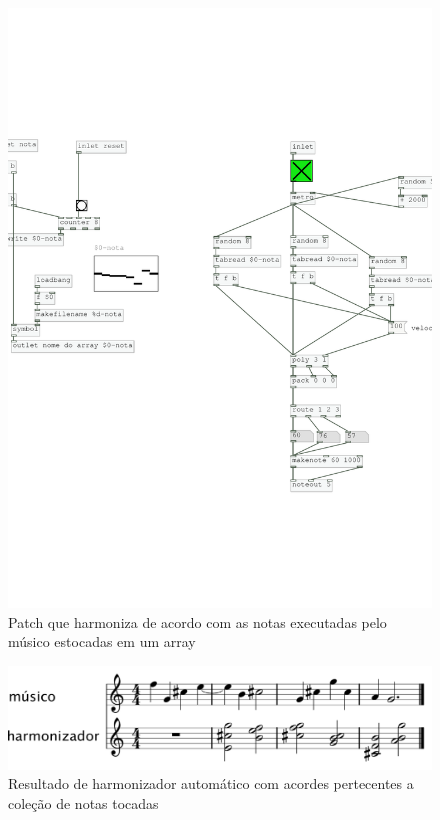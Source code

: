 \documentclass[draft]{ppgmus}
\begin{document}
\begin{figure}
\includegraphics[scale=.6]{harm6}
\caption{Patch que harmoniza de acordo com as notas executadas pelo músico estocadas em um array}
\label{harm6}
\end{figure}

\begin{figure}
\includegraphics[scale=.6]{harm-colecao}
\caption{Resultado de harmonizador automático com acordes pertecentes a coleção de notas tocadas}
\label{harm-colecao}
\end{figure}
\end{document}
